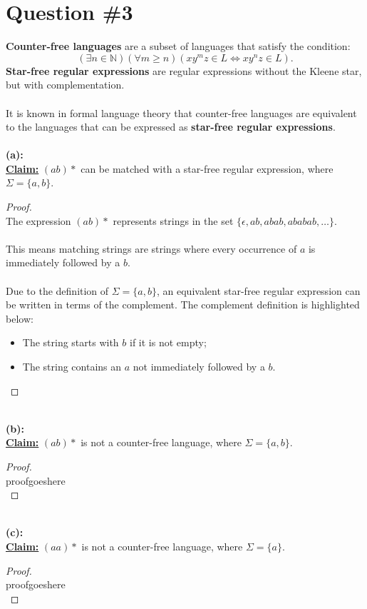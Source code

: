 \documentclass[12pt]{article}
\begin{document}
\section*{Question \#3}
\textbf{Counter-free languages} are a subset of languages that satisfy the condition:
\[
    (\exists n \in \mathbb{N})(\forall m \geq n)(xy^mz \in L \iff xy^nz \in L) \text{.}
\]
\textbf{Star-free regular expressions} are regular expressions without the Kleene star, but with complementation. \\
\\
It is known in formal language theory that counter-free languages are equivalent to the languages that can be expressed as \textbf{star-free regular expressions}. \\
\\
\textbf{(a):} \\
\textbf{\underline{Claim:}} $(ab)*$ can be matched with a star-free regular expression, where $\Sigma = \{ a, b \}$.
\begin{proof}
\leavevmode\\
    The expression $(ab)*$ represents strings in the set $\{ \epsilon, ab, abab, ababab, \dots\}$. \\
    \\
    This means matching strings are strings where every occurrence of $a$ is immediately followed by a $b$. \\
    \\
    Due to the definition of $\Sigma = \{ a, b \} $, an equivalent star-free regular expression can be written in terms of the complement. The complement definition is highlighted below:
    \begin{itemize}
        \item The string starts with $b$ if it is not empty;
        \item The string contains an $a$ not immediately followed by a $b$.
    \end{itemize}
    
\end{proof}
\leavevmode\\
\textbf{(b):} \\
\textbf{\underline{Claim:}} $(ab)*$ is not a counter-free language, where $\Sigma = \{ a, b \} $. 
\begin{proof}
\leavevmode\\
    proofgoeshere \\
\end{proof}
\leavevmode\\
\textbf{(c):} \\
\textbf{\underline{Claim:}} $(aa)*$ is not a counter-free language, where $\Sigma = \{ a \} $. 
\begin{proof}
\leavevmode\\
    proofgoeshere \\
\end{proof}
\pagebreak
\end{document}
